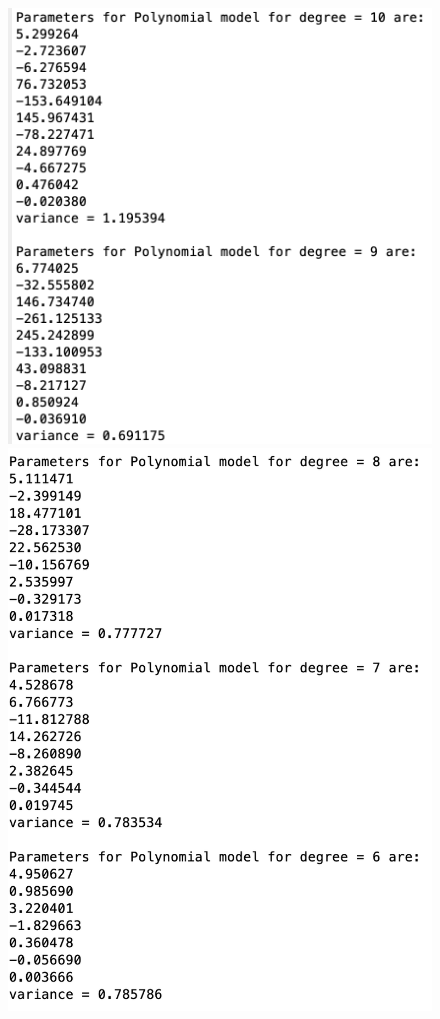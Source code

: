 \begin{figure}[H]
  \includegraphics[width=\linewidth]{ass4_4.png}
\endminipage\hfill
{}
  \includegraphics[width=\linewidth]{ass4_3.png}

\end{figure}
